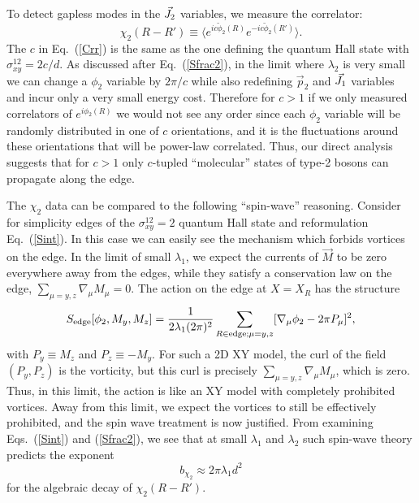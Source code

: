 To detect gapless modes in the $\vec{J}_2$ variables, we measure the correlator:
\begin{equation}
\chi_2(R-R')\equiv\langle e^{ic\tilde{\phi}_2(R)}e^{-ic\tilde{\phi}_2(R')}\rangle.
\label{Crr}
\end{equation}
The $c$ in Eq.~(\ref{Crr}) is the same as the one defining the quantum Hall state with $\sigma^{12}_{xy}=2c/d$.  As discussed after Eq.~(\ref{Sfrac2}), in the limit where $\lambda_2$ is very small we can change a $\phi_2$ variable by $2\pi/c$ while also redefining $\vec{p}_2$ and ${\vec{J}}_1$ variables and incur only a very small energy cost. Therefore for $c>1$ if we only measured correlators of $e^{i\phi_2(R)}$ we would not see any order since each $\phi_2$ variable will be randomly distributed in one of $c$ orientations, and it is the fluctuations around these orientations that will be power-law correlated.  Thus, our direct analysis suggests that for $c>1$ only $c$-tupled ``molecular'' states of type-2 bosons can propagate along the edge.

The $\chi_2$ data can be compared to the following ``spin-wave'' reasoning. Consider for simplicity edges of the $\sigma^{12}_{xy} = 2$ quantum Hall state and reformulation Eq.~(\ref{Sint}). In this case we can easily see the mechanism which forbids vortices on the edge. In the limit of small $\lambda_1$, we expect the currents of $\vec{M}$ to be zero everywhere away from the edges, while they satisfy a conservation law on the edge, $\sum_{\mu=y,z} \nabla_\mu M_\mu = 0$.  The action on the edge at $X=X_R$ has the structure 
\begin{equation*}
S_{\rm edge}[\phi_2, M_y, M_z] = \frac{1}{2\lambda_1 (2\pi)^2} \sum_{R \in \text{edge}; \mu=y,z}[\nabla_\mu \phi_2 - 2\pi P_\mu]^2,
\end{equation*}
with $P_y \equiv M_z$ and $P_z \equiv -M_y$.  For such a 2D XY model, the curl of the field $(P_y, P_z)$ is the vorticity, but this curl is precisely $\sum_{\mu=y,z} \nabla_\mu M_\mu$, which is zero.  Thus, in this limit, the action is like an XY model with completely prohibited vortices.  Away from this limit, we expect the vortices to still be effectively prohibited, and the spin wave treatment is now justified.  From examining Eqs.~(\ref{Sint}) and (\ref{Sfrac2}), we see that at small $\lambda_1$ and $\lambda_2$ such spin-wave theory predicts the exponent 
\begin{equation}
b_{\chi_2} \approx 2\pi\lambda_1 d^2
\end{equation}
for the algebraic decay of $\chi_2(R-R')$.  

